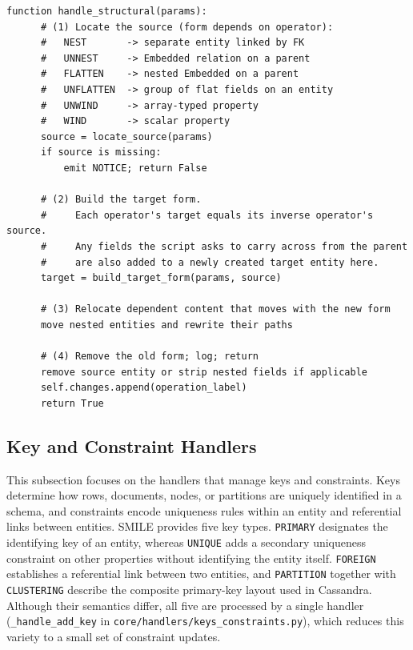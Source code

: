   \begin{lstlisting}[basicstyle=\small\ttfamily,
    caption={Algorithm of the six structural transformation handlers},
    label={alg:structural-handler}]
  function handle_structural(params):
      # (1) Locate the source (form depends on operator):
      #   NEST       -> separate entity linked by FK
      #   UNNEST     -> Embedded relation on a parent
      #   FLATTEN    -> nested Embedded on a parent
      #   UNFLATTEN  -> group of flat fields on an entity
      #   UNWIND     -> array-typed property
      #   WIND       -> scalar property
      source = locate_source(params)
      if source is missing:
          emit NOTICE; return False

      # (2) Build the target form.
      #     Each operator's target equals its inverse operator's source.
      #     Any fields the script asks to carry across from the parent
      #     are also added to a newly created target entity here.
      target = build_target_form(params, source)

      # (3) Relocate dependent content that moves with the new form
      move nested entities and rewrite their paths

      # (4) Remove the old form; log; return
      remove source entity or strip nested fields if applicable
      self.changes.append(operation_label)
      return True
  \end{lstlisting}

  \subsection{Key and Constraint Handlers}\label{subsec:transformer-keys}
  This subsection focuses on the handlers that manage keys and constraints. Keys determine how rows, documents, nodes, or partitions
  are uniquely identified in a schema, and constraints encode uniqueness
  rules within an entity and referential links between entities. SMILE
  provides five key types. \texttt{PRIMARY} designates the identifying
  key of an entity, whereas \texttt{UNIQUE} adds a secondary uniqueness
  constraint on other properties without identifying the entity itself.
  \texttt{FOREIGN} establishes a referential link between two entities,
  and \texttt{PARTITION} together with \texttt{CLUSTERING} describe the
  composite primary-key layout used in Cassandra. Although their
  semantics differ, all five are processed by a single handler
  (\texttt{\_handle\_add\_key} in \texttt{core/handlers/keys\_constraints.py}), which reduces this
  variety to a small set of constraint updates.


